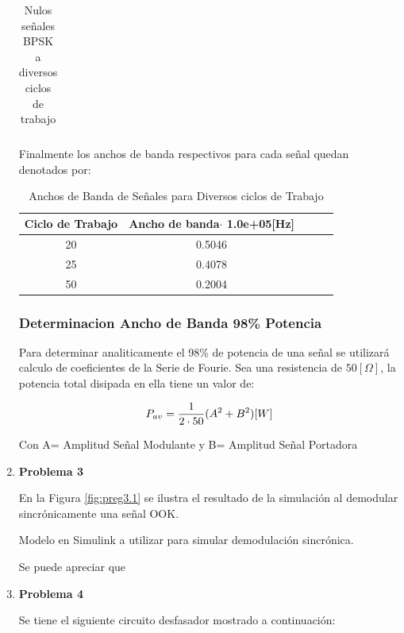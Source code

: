 \documentclass[letterpaper, titlepage]{article}
\begin{document}
\begin{enumerate}
\begin{table}[ht]
\begin{tabular}{c c c c c}
			\end{tabular}
			\caption{Nulos señales BPSK a diversos ciclos de trabajo}
			\label{tab:tabla1}
		\end{table}
		
		\begin{center}
		Finalmente los anchos de banda respectivos para cada señal quedan denotados por:
		\end{center}

		\begin{table}[ht]
			\centering
			\begin{tabular}{c c c c c}
				Ciclo de Trabajo & Ancho de banda$\cdot$ 1.0e+05[Hz] \\
				\hline
				20 & 0.5046   \\
				25 & 0.4078	  \\
				50 & 0.2004   \\
			\end{tabular}
			\caption{Anchos de Banda de Señales para Diversos ciclos de Trabajo}
			\label{tab:tabla1}
		\end{table}	

		\subsubsection{Determinacion Ancho de Banda 98\% Potencia}
			Para determinar analiticamente el 98\% de potencia de una señal se utilizará calculo de 			coeficientes de la Serie de Fourie. Sea una resistencia de $50[\Omega]$, la potencia total disipada en ella tiene un valor de:
			
		\begin{equation}	
	P_{av}={1 \over 2 \cdot 50}(A^{2}+B^{2})[W]
		\end{equation}
		
		
	Con A= Amplitud Señal Modulante y B= Amplitud Señal Portadora	
		
		\item \textbf{Problema 3}
		
		En la Figura \ref{fig:preg3.1} se ilustra el resultado de la simulación al demodular sincrónicamente una señal OOK.
		
			{Modelo en Simulink a utilizar para simular demodulación sincrónica.}
			
		Se puede apreciar que 
		\item \textbf{Problema 4}
		
		Se tiene el siguiente circuito desfasador mostrado a continuación:
		

\end{enumerate}
\end{document}
